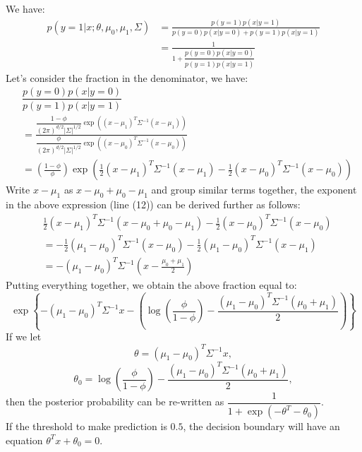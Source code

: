 \begin{answer}	
We have:
%
\begin{align}
	p(y = 1|x; \theta, \mu_0, \mu_1, \Sigma)
	&= \frac{p(y =1)p(x|y = 1)}{p(y = 0)p(x|y = 0) + p(y=1)p(x|y = 1)} \\
	&= \frac{1}{1 + \dfrac{p(y = 0)p(x|y = 0)}{p(y=1)p(x|y = 1)}}
\end{align}
%
Let's consider the fraction in the denominator, we have:
%
\begin{align}
	& \dfrac{p(y = 0)p(x|y = 0)}{p(y=1)p(x|y = 1)} \\
	&= \frac{\dfrac{1 - \phi}{(2\pi)^{d/2}|\Sigma|^{1/2}} \exp((x - \mu_1)^T \Sigma^{-1} (x - \mu_1))}{\dfrac{\phi}{(2\pi)^{d/2}|\Sigma|^{1/2}} \exp((x - \mu_0)^T \Sigma^{-1} (x - \mu_0))} \\
	&= \left(\frac{1 - \phi}{\phi}\right) \exp\left( \frac{1}{2} (x - \mu_1)^T \Sigma^{-1} (x - \mu_1) - \frac{1}{2} (x - \mu_0)^T \Sigma^{-1} (x - \mu_0) \right)
\end{align}
% 
Write $x - \mu_1$ as $x - \mu_0 + \mu_0 - \mu_1$ and group similar terms together, the exponent in the above expression (line (12)) can be derived further as follows:
%
\begin{align}
& \frac{1}{2} (x - \mu_1)^T \Sigma^{-1} (x - \mu_0 + \mu_0 - \mu_1) - \frac{1}{2} (x - \mu_0)^T \Sigma^{-1} (x - \mu_0) \\
&= -\frac{1}{2} (\mu_1 - \mu_0)^T \Sigma^{-1} (x - \mu_0) - \frac{1}{2} (\mu_1 - \mu_0)^T \Sigma^{-1} (x - \mu_1) \\
&= -(\mu_1 - \mu_0)^T \Sigma^{-1} (x - \frac{\mu_0 + \mu_1}{2})
\end{align}
%
Putting everything together, we obtain the above fraction equal to:
$$ \exp\left\{-(\mu_1 - \mu_0)^T \Sigma^{-1}x - \left( \log \left( \frac{\phi}{1 - \phi} \right) - \frac{(\mu_1 - \mu_0)^T \Sigma^{-1} (\mu_0 + \mu_1)}{2} \right) \right\} $$
If we let $$\theta = (\mu_1 - \mu_0)^T \Sigma^{-1}x,$$ $$\theta_0 = \log \left( \dfrac{\phi}{1 - \phi} \right) - \dfrac{(\mu_1 - \mu_0)^T \Sigma^{-1} (\mu_0 + \mu_1)}{2},$$ then the posterior probability can be re-written as $\dfrac{1}{1 + \exp(-\theta^T - \theta_0)}$. \\[2pt]
If the threshold to make prediction is $0.5$, the decision boundary will have an equation $\theta^T x + \theta_0 = 0$. \\
\end{answer}

